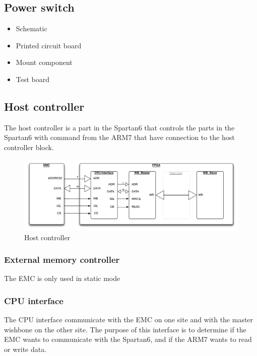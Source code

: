 \subsection{Power switch}
\begin{itemize}
	\item Schematic
	\item Printed circuit board
	\item Mount component
	\item Test board
\end{itemize}



\subsection{Host controller}
The host controller is a part in the Spartan6 that controls the parts in the Spartan6 with command from the ARM7 that have connection to the host controller block.
\begin{figure}[H]
	\begin{centering}
		 \includegraphics[width=1.0\textwidth]{images/host_controller.pdf}
		\caption{Host controller}
	\end{centering}
\end{figure}
\subsubsection{External memory controller}
The EMC is only used in static mode
\subsubsection{CPU interface}
The CPU interface communicate with the EMC on one site and with the master wishbone on the other site. The purpose of this interface is to determine if the EMC wants to communicate with the Spartan6, and if the ARM7 wants to read or write data.

